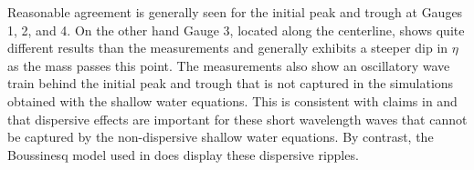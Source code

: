 Reasonable agreement is generally seen for the initial peak and trough at 
Gauges 1, 2, and 4.  On the other hand 
Gauge 3, located along the centerline, shows quite
different results than the measurements and generally exhibits a steeper dip
in $\eta$ as the mass passes this point.   The measurements also show an
oscillatory wave train behind the initial peak and trough that is not
captured in the simulations obtained with the shallow water equations.  This
is consistent with claims in \cite{bp-description} and \cite{EnetGrilli}
that dispersive effects are important for these short wavelength waves that
cannot be captured by the non-dispersive shallow water equations.  By
contrast, the Boussinesq model used in \cite{FuhrmanMadsen} 
does display these dispersive ripples.




